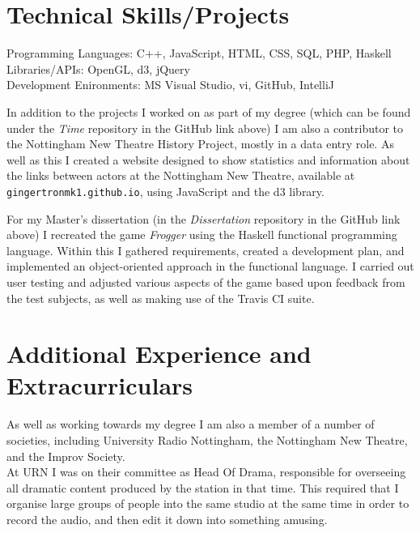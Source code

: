 \documentclass[10pt]{article}
\begin{document}
\section*{Technical Skills/Projects}

Programming Languages: C++, JavaScript, HTML, CSS, SQL, PHP, Haskell\\
Libraries/APIs: OpenGL, d3, jQuery\\
Development Enironments: MS Visual Studio, vi, GitHub, IntelliJ

\vskip 5mm

In addition to the projects I worked on as part of my degree (which can be found under the \emph{Time} repository in the GitHub link above) I am also a contributor to the Nottingham New Theatre History Project, mostly in a data entry role.
As well as this I created a website designed to show statistics and information about the links between actors at the Nottingham New Theatre, available at \verb|gingertronmk1.github.io|, using JavaScript and the d3 library.

\par

For my Master's dissertation (in the \emph{Dissertation} repository in the GitHub link above) I recreated the game \emph{Frogger} using the Haskell functional programming language.
Within this I gathered requirements, created a development plan, and implemented an object-oriented approach in the functional language.
I carried out user testing and adjusted various aspects of the game based upon feedback from the test subjects, as well as making use of the Travis CI suite.

\section*{Additional Experience and Extracurriculars}

As well as working towards my degree I am also a member of a number of societies, including University Radio Nottingham, the Nottingham New Theatre, and the Improv Society.\\

At URN I was on their committee as Head Of Drama, responsible for overseeing all dramatic content produced by the station in that time.
This required that I organise large groups of people into the same studio at the same time in order to record the audio, and then edit it down into something amusing.\\
\end{document}
